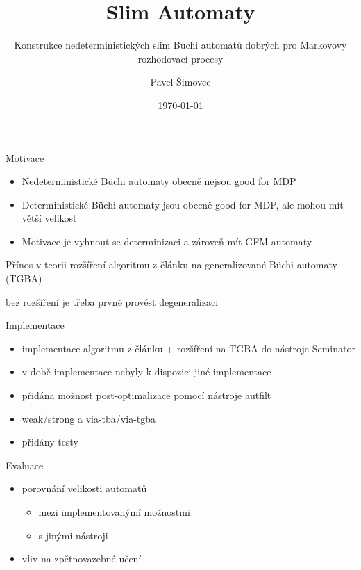 \documentclass[
]{beamer}
\title[Slim Automata]{Slim Automaty}
\subtitle[Cons]{Konstrukce nedeterministických slim Buchi automatů dobrých pro Markovovy rozhodovací procesy}
\author[P. Šimovec]{Pavel Šimovec\texorpdfstring{\\}{, }}
\institute[FI MU]{Fakulta Informatiky, Masarykova Univerzita}
\date{\today}
\begin{document}
	
	\begin{frame}[plain]
		\maketitle
	\end{frame}
	
	
	\begin{frame}{Motivace}
		\begin{itemize}
			\item Nedeterministické Büchi automaty obecně nejsou good for MDP
			\item Deterministické Büchi automaty jsou obecně good for MDP, ale mohou mít větší velikost
			\item Motivace je vyhnout se determinizaci a zároveň mít GFM automaty
		\end{itemize}
	\end{frame}

	\begin{frame}{Přínos v teorii}
		rozšíření algoritmu z článku na \alert{generalizované} Büchi automaty (TGBA)
		
		bez rozšíření je třeba prvně provést degeneralizaci
	
	
	\end{frame}
	
	\begin{frame}{Implementace}
		\begin{itemize}
			\item implementace algoritmu z článku + rozšíření na TGBA do nástroje Seminator
			\pause
			\item v době implementace nebyly k dispozici jiné implementace
			\pause
			\item přidána možnost post-optimalizace pomocí nástroje autfilt
			\pause
			\item weak/strong a via-tba/via-tgba 
			\pause
			\item přidány testy
		\end{itemize}
	\end{frame}

	\begin{frame}{Evaluace}
		\begin{itemize}
			\item porovnání velikosti automatů
			\begin{itemize}
				\item mezi implementovanýmí možnostmi
				\item s jinými nástroji
			\end{itemize}
			\item vliv na zpětnovazebné učení
		\end{itemize}
	\end{frame}
\end{document}
